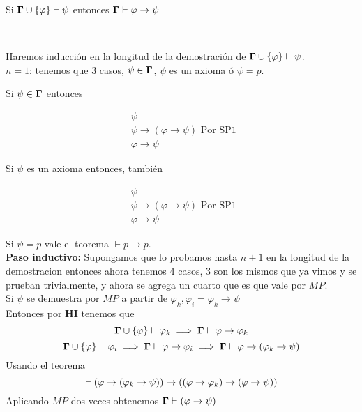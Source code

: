 \documentclass[leqno, 12pt, twoside,letterpaper]{book}
\begin{document}
\begin{solucion}
\begin{teo}{} Si $\bm{\Gamma} \cup \{ \varphi \} \vdash \psi$ entonces $\bm{\Gamma} \vdash
				  \varphi \rightarrow \psi $ \end{teo} \\

\begin{dem}
	Haremos inducción en la longitud de la demostración de $\bm{\Gamma} \cup \{ \varphi \} \vdash \psi$.\\

\noindent\textbf{$n = 1$}: tenemos que 3 casos, $\psi \in \bm{\Gamma}$, $\psi$ es un axioma ó $\psi = p$.

Si $\psi \in \bm{\Gamma}$ entonces

\begin{align}
& \psi \\
& \psi \rightarrow (\varphi \rightarrow \psi) \mbox{ Por SP1 } \\
& \varphi \rightarrow \psi
\end{align}

\noindent Si $\psi$ es un axioma entonces, también

\begin{align}
& \psi \\
& \psi \rightarrow (\varphi \rightarrow \psi) \mbox{ Por SP1 } \\
& \varphi \rightarrow \psi
\end{align}

\noindent Si $\psi = p$ vale el teorema $\vdash p \rightarrow p$.\\

\noindent \textbf{Paso inductivo:} Supongamos que lo probamos hasta $n + 1$ en la longitud de la demostracion
entonces ahora tenemos 4 casos, 3 son los mismos que ya vimos y se prueban trivialmente, y ahora se agrega un cuarto que es que vale por $MP$. \\

\noindent Si $\psi$ se demuestra por $MP$ a partir de $\varphi_k, \varphi_i = \varphi_k \rightarrow \psi$  \\
Entonces por \textbf{HI} tenemos que
 \[ \bm{\Gamma} \cup \{ \varphi \} \vdash \varphi_k \implies \bm{\Gamma} \vdash \varphi \rightarrow \varphi_k\]
 \[ \bm{\Gamma} \cup \{ \varphi \} \vdash \varphi_i \implies \bm{\Gamma} \vdash \varphi \rightarrow \varphi_i \implies \bm{\Gamma} \vdash \varphi \rightarrow (\varphi_k \rightarrow \psi) \]
Usando el teorema
\[\vdash (\varphi \rightarrow (\varphi_k \rightarrow \psi)) \rightarrow ((\varphi \rightarrow \varphi_k) \rightarrow (\varphi \rightarrow \psi))\]
 Aplicando $MP$ dos veces obtenemos $\bm{\Gamma} \vdash (\varphi \rightarrow \psi)$
\end{dem}
\end{solucion}
\end{document}
